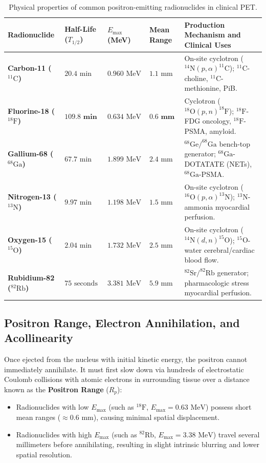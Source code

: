 \documentclass[11pt,a4paper]{article}
\begin{document}
\begin{table}[htbp]
\centering
\small
\renewcommand{\arraystretch}{1.25}
\begin{tabular}{p{2.8cm}p{2.2cm}p{2cm}p{2.2cm}p{5.5cm}}
\toprule
\textbf{Radionuclide} & \textbf{Half-Life ($T_{1/2}$)} & \textbf{$E_{\max}$ (MeV)} & \textbf{Mean Range} & \textbf{Production Mechanism and Clinical Uses} \\
\midrule
\textbf{Carbon-11 ($^{11}\text{C}$)} & $20.4\text{ min}$ & $0.960\text{ MeV}$ & $1.1\text{ mm}$ & On-site cyclotron ($^{14}\text{N}(p,\alpha)^{11}\text{C}$); $^{11}\text{C}$-choline, $^{11}\text{C}$-methionine, PiB. \\
\textbf{Fluorine-18 ($^{18}\text{F}$)} & $\mathbf{109.8\text{ min}}$ & $0.634\text{ MeV}$ & $\mathbf{0.6\text{ mm}}$ & Cyclotron ($^{18}\text{O}(p,n)^{18}\text{F}$); $^{18}\text{F}$-FDG oncology, $^{18}\text{F}$-PSMA, amyloid. \\
\textbf{Gallium-68 ($^{68}\text{Ga}$)} & $67.7\text{ min}$ & $1.899\text{ MeV}$ & $2.4\text{ mm}$ & $^{68}\text{Ge}/^{68}\text{Ga}$ bench-top generator; $^{68}\text{Ga}$-DOTATATE (NETs), $^{68}\text{Ga}$-PSMA. \\
\textbf{Nitrogen-13 ($^{13}\text{N}$)} & $9.97\text{ min}$ & $1.198\text{ MeV}$ & $1.5\text{ mm}$ & On-site cyclotron ($^{16}\text{O}(p,\alpha)^{13}\text{N}$); $^{13}\text{N}$-ammonia myocardial perfusion. \\
\textbf{Oxygen-15 ($^{15}\text{O}$)} & $2.04\text{ min}$ & $1.732\text{ MeV}$ & $2.5\text{ mm}$ & On-site cyclotron ($^{14}\text{N}(d,n)^{15}\text{O}$); $^{15}\text{O}$-water cerebral/cardiac blood flow. \\
\textbf{Rubidium-82 ($^{82}\text{Rb}$)} & $75\text{ seconds}$ & $3.381\text{ MeV}$ & $5.9\text{ mm}$ & $^{82}\text{Sr}/^{82}\text{Rb}$ generator; pharmacologic stress myocardial perfusion. \\
\bottomrule
\end{tabular}
\caption{Physical properties of common positron-emitting radionuclides in clinical PET.}
\label{tab:radionuclides}
\end{table}

\subsection{Positron Range, Electron Annihilation, and Acollinearity}
Once ejected from the nucleus with initial kinetic energy, the positron cannot immediately annihilate. It must first slow down via hundreds of electrostatic Coulomb collisions with atomic electrons in surrounding tissue over a distance known as the \textbf{Positron Range} ($R_p$):
\begin{itemize}
    \item Radionuclides with low $E_{\max}$ (such as $^{18}\text{F}$, $E_{\max} = 0.63\text{ MeV}$) possess short mean ranges ($\approx 0.6\text{ mm}$), causing minimal spatial displacement.
    \item Radionuclides with high $E_{\max}$ (such as $^{82}\text{Rb}$, $E_{\max} = 3.38\text{ MeV}$) travel several millimeters before annihilating, resulting in slight intrinsic blurring and lower spatial resolution.
\end{itemize}
\end{document}
